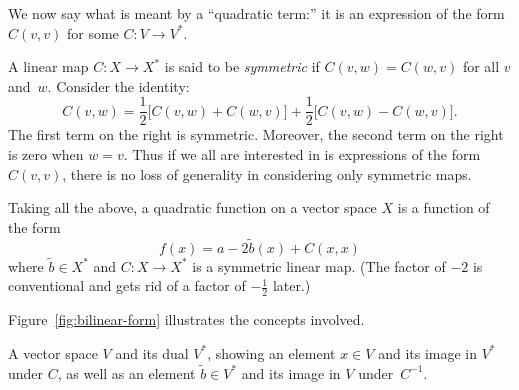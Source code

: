 \documentclass[10pt, a4paper]{article}
\begin{document}
We now say what is meant by a “quadratic term:” it is an expression of
the form $C(v,v)$ for some $C\colon V\to V^*$. 



A linear map $C\colon X\to X^*$ is said to be \emph{symmetric} if
$C(v,w)=C(w,v)$ for all $v$ and~$w$. Consider the identity:
\begin{equation*}
  C(v, w) = \frac{1}{2}\bigl[C(v,w) + C(w,v)\bigr]
  + \frac{1}{2}\bigl[C(v,w) - C(w,v)\bigr].
\end{equation*}
The first term on the right is symmetric. Moreover, the second term on
the right is zero when $w=v$. Thus if we all are interested in is
expressions of the form $C(v,v)$, there is no loss of generality in
considering only symmetric maps.

Taking all the above, a quadratic function on a vector space $X$ is a
function of the form
\begin{equation*}
  f(x) = a - 2\tilde{b}(x) + C(x,x)
\end{equation*}
where $\tilde{b}\in X^*$ and $C\colon X\to X^*$ is a symmetric linear
map. (The factor of $-2$ is conventional and gets rid of a factor of
$-\frac{1}{2}$ later.)

Figure~\ref{fig:bilinear-form} illustrates
the concepts involved.
\begin{marginfigure}
  \begin{center}
  \end{center}
\caption{A vector space $V$ and its dual $V^*$, showing an element $x\in
  V$ and its image in $V^*$ under $C$, as well as an element
  $\tilde{b}\in V^*$ and its image in $V$ under~$C^{-1}$.\label{fig:bilinear-form}}
\end{marginfigure}
\end{document}
